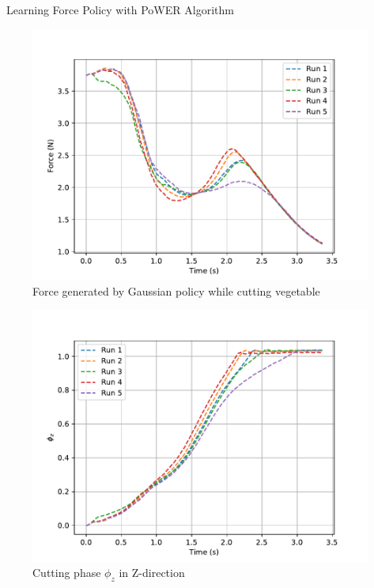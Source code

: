 \documentclass[aspectratio=43,10pt,fleqn,t]{beamer}
\begin{document}
\begin{frame}{~}{\small Learning Force Policy with PoWER Algorithm}
	
	\begin{minipage}[t]{0.49\textwidth}
		\begin{figure}
			\includegraphics[width=\textwidth]{images/exp/cut/power_f2}
			\caption{\scriptsize Force generated by Gaussian policy while cutting vegetable}
		\end{figure}
	\end{minipage}
	\hfill
	\begin{minipage}[t]{0.49\textwidth}
		
		\begin{figure}
			\includegraphics[width=\textwidth]{images/exp/cut/power_ph_z2}
			\caption{\scriptsize Cutting phase $\phi_{z}$ in Z-direction}
		\end{figure}
	\end{minipage}
\end{frame}
\end{document}

